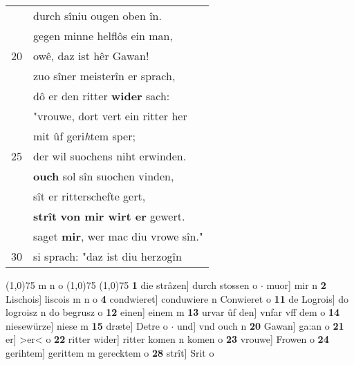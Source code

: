 \documentclass[8pt,a4paper,notitlepage]{article}
\begin{document}
\begin{table}[ht]
\begin{minipage}[t]{0.5\linewidth}
\begin{tabular}{rl}
 & durch sîniu ougen oben în.\\ 
 & gegen minne helflôs ein man,\\ 
20 & owê, daz ist hêr Gawan!\\ 
 & zuo sîner meisterîn er sprach,\\ 
 & dô er den ritter \textbf{wider} sach:\\ 
 & "vrouwe, dort vert ein ritter her\\ 
 & mit ûf geri\textit{h}tem sper;\\ 
25 & der wil suochens niht erwinden.\\ 
 & \textbf{ouch} sol sîn suochen vinden,\\ 
 & sît er ritterschefte gert,\\ 
 & \textbf{strît} \textbf{von mir wirt er} gewert.\\ 
 & saget \textbf{mir}, wer mac diu vrowe sîn."\\ 
30 & si sprach: "daz ist diu herzogîn\\ 
\end{tabular}
\scriptsize
\line(1,0){75} \newline
m n o \newline
\line(1,0){75} \newline
\newline
\line(1,0){75} \newline
\textbf{1} die strâzen] durch stossen o  $\cdot$ muor] mir n \textbf{2} Lischois] liscois m n o \textbf{4} condwieret] conduwiere n Conwieret o \textbf{11} de Logrois] do logroisz n do begrusz o \textbf{12} einen] einem m \textbf{13} urvar ûf den] vnfar vff dem o \textbf{14} niesewürze] niese m \textbf{15} dræte] Detre o  $\cdot$ und] vnd ouch n \textbf{20} Gawan] ga:an o \textbf{21} er] >er< o \textbf{22} ritter wider] ritter komen n komen o \textbf{23} vrouwe] Frowen o \textbf{24} gerihtem] gerittem m gerecktem o \textbf{28} strît] Srit o \newline
\end{minipage}
\end{table}
\newpage
\end{document}
